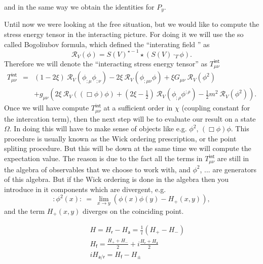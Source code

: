 \documentclass[10pt]{book}
\theoremstyle{break}
\begin{document}
%
and in the same way we obtain the identities for $P_y$.\par%
%
\bigskip%
%
Until now we were looking at the free situation, but we would like to compute the stress energy tensor in the interacting picture. For doing it we will use the so called Bogoliubov formula, which defined the ``interating field '' as%
%
\begin{equation*}
\mathcal{R}_V(\phi) = S(V)^{\star-1} \star \left( S(V) \cdot_T \phi \right) .
\end{equation*}
%
Therefore we will denote the ``interacting stress energy tensor'' as $T^\mathsf{int}_{\mu\nu}$%
%
\begin{eqnarray*}
T^\mathsf{int}_{\mu\nu} &=& \left(1-2\xi\right) \ \mathcal{R}_V\left(\phi_{;\mu} \phi_{;\nu}\right) - 2 \xi \ \mathcal{R}_V\left(\phi_{;\mu\nu} \phi\right) + \xi G_{\mu\nu} \ \mathcal{R}_V\left(\phi^2\right) \\
&& + g_{\mu\nu} \left( 2\xi \ \mathcal{R}_V\left(\left(\Box\phi\right) \phi\right) + \left(2\xi-\frac12\right) \ \mathcal{R}_V\left(\phi_{;\rho} \phi^{;\rho}\right) - \frac12 m^2 \ \mathcal{R}_V\left(\phi^2\right) \right) .
\end{eqnarray*}
%
Once we will have compute $T^\mathsf{int}_{\mu\nu}$ at a sufficient order in $\chi$ (coupling constant for the intercation term), then the next step will be to evaluate our result on a state $\Omega$. In doing this will have to make sense of objects like e.g. $\phi^2$, $\left(\Box\phi\right)\phi$. This procedure is usually known as the Wick ordering prescription, or the point spliting procedure. But this will be down at the same time we will compute the expectation value. The reason is due to the fact all the terms in $T^\mathsf{int}_{\mu\nu}$ are still in the algebra of observables that we choose to work with, and $\phi^2$, ... are generators of this algebra. But if the Wick ordering is done in the algebra then you introduce in it components which are divergent, e.g.%
%
\begin{equation*}
:\phi^2(x): \ = \ \lim_{x\to y} \left( \phi(x) \phi(y) - H_+(x,y) \right) ,
\end{equation*}
%
and the term $H_+(x,y)$ diverges on the coinciding point.\par%
%
\vfill%
%
\begin{eqnarray*}
&& H  = H_\mathsf{r}-H_\mathsf{a} = \frac{1}{i} \left( H_+ - H_-\right) \\
&& H_\mathsf{f} = \frac{H_+ + H_-}{2} + i \frac{H_\mathsf{r} + H_\mathsf{a}}{2} \\
&& i H_{\mathsf{a}/\mathsf{r}} = H_\mathsf{f} - H_{\pm}
\end{eqnarray*}
\end{document}
